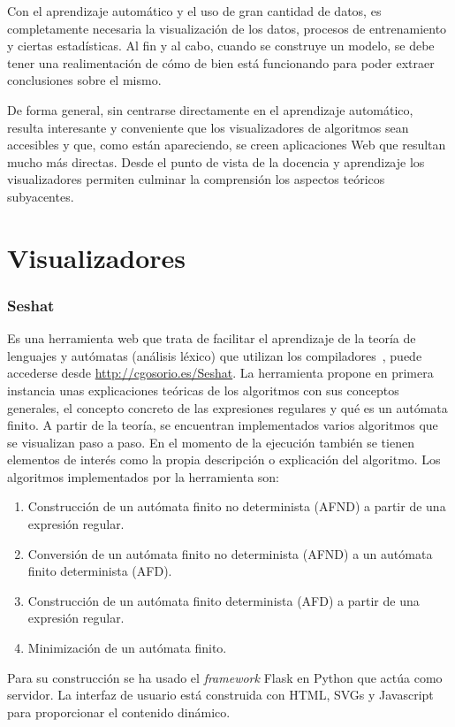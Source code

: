 
Con el aprendizaje automático y el uso de gran cantidad de datos, es
completamente necesaria la visualización de los datos, procesos de entrenamiento
y ciertas estadísticas. Al fin y al cabo, cuando se construye un modelo, se debe
tener una realimentación de cómo de bien está funcionando para poder extraer
conclusiones sobre el mismo.

De forma general, sin centrarse directamente en el aprendizaje automático,
resulta interesante y conveniente que los visualizadores de algoritmos sean
accesibles y que, como están apareciendo, se creen aplicaciones Web que resultan
mucho más directas. Desde el punto de vista de la docencia y aprendizaje los
visualizadores permiten culminar la comprensión los aspectos teóricos
subyacentes.

\section{Visualizadores}

\subsubsection{Seshat} 
Es una herramienta web que trata de facilitar el aprendizaje de la teoría de
lenguajes y autómatas (análisis léxico) que utilizan los
compiladores~\cite{arnaiz2018seshat}, puede accederse desde
\url{http://cgosorio.es/Seshat}. La herramienta propone en primera instancia
unas explicaciones teóricas de los algoritmos con sus conceptos generales, el
concepto concreto de las expresiones regulares y qué es un autómata finito. A
partir de la teoría, se encuentran implementados varios algoritmos que se
visualizan paso a paso. En el momento de la ejecución también se tienen
elementos de interés como la propia descripción o explicación del algoritmo. Los
algoritmos implementados por la herramienta son:
\begin{enumerate}
    \item Construcción de un autómata finito no determinista (AFND) a partir de una expresión regular.
    \item Conversión de un autómata finito no determinista (AFND) a un autómata finito determinista (AFD).
    \item Construcción de un autómata finito determinista (AFD) a partir de una expresión regular.
    \item Minimización de un autómata finito.
\end{enumerate}
Para su construcción se ha usado el \emph{framework} Flask en Python que actúa
como servidor. La interfaz de usuario está construida con HTML, SVGs y
Javascript para proporcionar el contenido dinámico.

